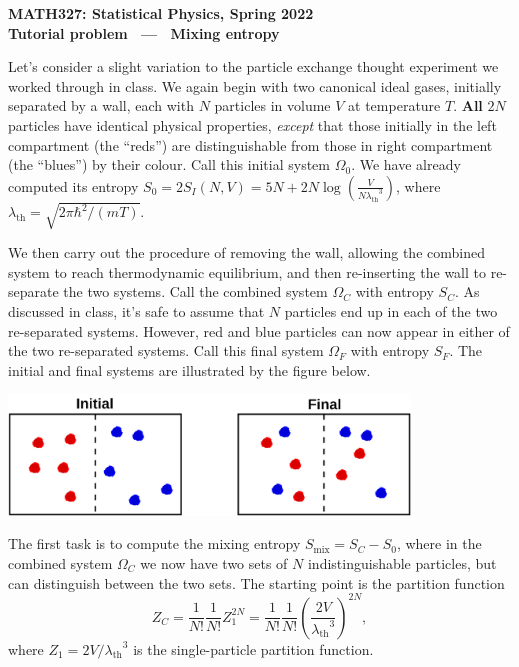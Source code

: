 \documentclass[12 pt]{article} %
\newcommand{\la}{\ensuremath{\lambda} }
\newcommand{\lath}{\ensuremath{\la_{\mathrm{th}}} }
\newcommand{\Om}{\ensuremath{\Omega} }
\begin{document}
\newcommand{\thisweek}{MATH327 Tutorial (Mixing)}
\newcommand{\moddate}{Last modified 4 Mar.~2022}
\begin{center}
  {\Large \textbf{MATH327: Statistical Physics, Spring 2022}} \\[12 pt]
  {\Large \textbf{Tutorial problem \ --- \ Mixing entropy}} \\[24 pt]
\end{center}

Let's consider a slight variation to the particle exchange thought experiment we worked through in class.
We again begin with two canonical ideal gases, initially separated by a wall, each with $N$ particles in volume $V$ at temperature $T$.
\textbf{All} $2N$ particles have identical physical properties, \textit{except} that those initially in the left compartment (the ``reds'') are distinguishable from those in right compartment (the ``blues'') by their colour.
Call this initial system $\Om_0$.
We have already computed its entropy $S_0 = 2S_I(N, V) = 5N + 2N\log\left(\frac{V}{N\lath^3}\right)$, where $\lath = \sqrt{2\pi\hbar^2 / (mT)}$.

We then carry out the procedure of removing the wall, allowing the combined system to reach thermodynamic equilibrium, and then re-inserting the wall to re-separate the two systems.
Call the combined system $\Om_C$ with entropy $S_C$.
As discussed in class, it's safe to assume that $N$ particles end up in each of the two re-separated systems.
However, red and blue particles can now appear in either of the two re-separated systems.
Call this final system $\Om_F$ with entropy $S_F$.
The initial and final systems are illustrated by the figure below.

\begin{center}\includegraphics[width=0.8\textwidth]{figs/mix.pdf}\end{center}

The first task is to compute the mixing entropy $S_{\text{mix}} = S_C - S_0$, where in the combined system $\Om_C$ we now have two sets of $N$ indistinguishable particles, but can distinguish between the two sets.
The starting point is the partition function
\begin{equation*}
  Z_C = \frac{1}{N!} \frac{1}{N!} Z_1^{2N} = \frac{1}{N!} \frac{1}{N!} \left(\frac{2V}{\lath^3}\right)^{2N},
\end{equation*}
where $Z_1 = 2V / \lath^3$ is the single-particle partition function.
\end{document}

